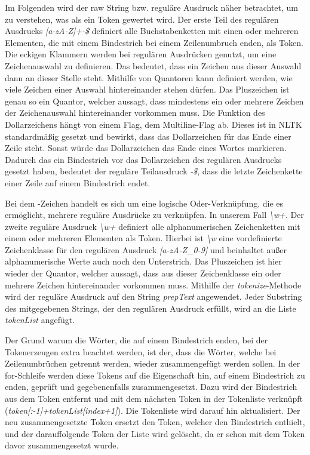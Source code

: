 Im Folgenden wird der raw String bzw. reguläre Ausdruck näher betrachtet, um zu verstehen, was als ein Token gewertet wird. Der erste Teil des regulären Ausdrucks \textit{[a-zA-Z]+-\$} definiert alle Buchstabenketten mit einen oder mehreren Elementen, die mit einem Bindestrich bei einem Zeilenumbruch enden, als Token. Die eckigen Klammern werden bei regulären Ausdrücken genutzt, um eine Zeichenauswahl zu definieren. Das bedeutet, dass ein Zeichen aus dieser Auswahl dann an dieser Stelle steht. Mithilfe von Quantoren kann definiert werden, wie viele Zeichen einer Auswahl hintereinander stehen dürfen. Das Pluszeichen ist genau so ein Quantor, welcher aussagt, dass mindestens ein oder mehrere Zeichen der Zeichenauswahl hintereinander vorkommen muss. Die Funktion des Dollarzeichens hängt von einem Flag, dem Multiline-Flag ab. Dieses ist in NLTK standardmäßig gesetzt und bewirkt, dass das Dollarzeichen für das Ende einer Zeile steht.\cite{nltk} Sonst würde das Dollarzeichen das Ende eines Wortes markieren. Dadurch das ein Bindestrich vor das Dollarzeichen des regulären Ausdrucks gesetzt haben, bedeutet der reguläre Teilausdruck \textit{-\$}, dass die letzte Zeichenkette einer Zeile auf einem Bindestrich endet.

Bei dem \textbar{}-Zeichen handelt es sich um eine logische Oder-Verknüpfung, die es ermöglicht, mehrere reguläre Ausdrücke zu verknüpfen. In unserem Fall \textit{\textbackslash w+}. Der zweite reguläre Ausdruck \textit{\textbackslash w+} definiert alle alphanumerischen Zeichenketten mit einem oder mehreren Elementen als Token. Hierbei ist \textit{\textbackslash w} eine vordefinierte Zeichenklasse für den regulären Ausdruck \textit{[a-zA-Z\_0-9]} und beinhaltet außer alphanumerische Werte auch noch den Unterstrich. Das Pluszeichen ist hier wieder der Quantor, welcher aussagt, dass aus dieser Zeichenklasse ein oder mehrere Zeichen hintereinander vorkommen muss. Mithilfe der \textit{tokenize}-Methode wird der reguläre Ausdruck auf den String \textit{prepText} angewendet. Jeder Substring des mitgegebenen Strings, der den regulären Ausdruck erfüllt, wird an die Liste \textit{tokenList} angefügt.

Der Grund warum die Wörter, die auf einem Bindestrich enden, bei der Tokenerzeugen extra beachtet werden, ist der, dass die Wörter, welche bei Zeilenumbrüchen getrennt werden, wieder zusammengefügt werden sollen. In der for-Schleife werden diese Tokens auf die Eigenschaft hin, auf einem Bindestrich zu enden, geprüft und gegebenenfalls zusammengesetzt. Dazu wird der Bindestrich aus dem Token entfernt und mit dem nächsten Token in der Tokenliste verknüpft (\textit{token[:-1]+tokenList[index+1]}). Die Tokenliste wird darauf hin aktualisiert. Der neu zusammengesetzte Token ersetzt den Token, welcher den Bindestrich enthielt, und der darauffolgende Token der Liste wird gelöscht, da er schon mit dem Token davor zusammengesetzt wurde.

